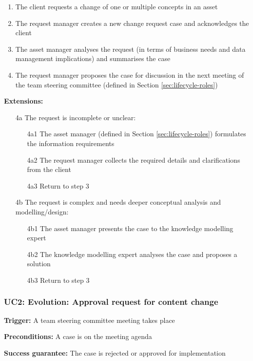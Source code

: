 	\begin{enumerate}
		\item The client requests a change of one or multiple concepts in an asset
		\item The request manager creates a new change request case and acknowledges the client
		\item The asset manager analyses the request (in terms of business needs and data management implications) and summarises the case
		\item The request manager proposes the case for discussion in the next meeting of the team steering committee (defined in Section \ref{sec:lifecycle-roles})		
	\end{enumerate}
	\textbf{Extensions:}
	\begin{enumerate}
		\item [4a] The request is incomplete or unclear:
		\begin{enumerate}
			\item [4a1] The asset manager (defined in Section \ref{sec:lifecycle-roles}) formulates the information requirements			
			\item [4a2] The request manager collects the required details and clarifications from the client
			\item [4a3] Return to step 3 
		\end{enumerate}
		\item [4b] The request is complex and needs deeper conceptual analysis and modelling/design:
		\begin{enumerate}
			\item [4b1] The asset manager presents the case to the knowledge modelling expert 
			\item [4b2] The knowledge modelling expert analyses the case and proposes a solution
			\item [4b3] Return to step 3			
		\end{enumerate}
	\end{enumerate}
	
	
	\subsubsection{UC2: Evolution: Approval request for content change}
	\label{sec:uc2}
	
	\textbf{Trigger:} A team steering committee meeting takes place 
	
	\textbf{Preconditions:} A case is on the meeting agenda 
	
	\textbf{Success guarantee:} The case is rejected or approved for implementation
	

